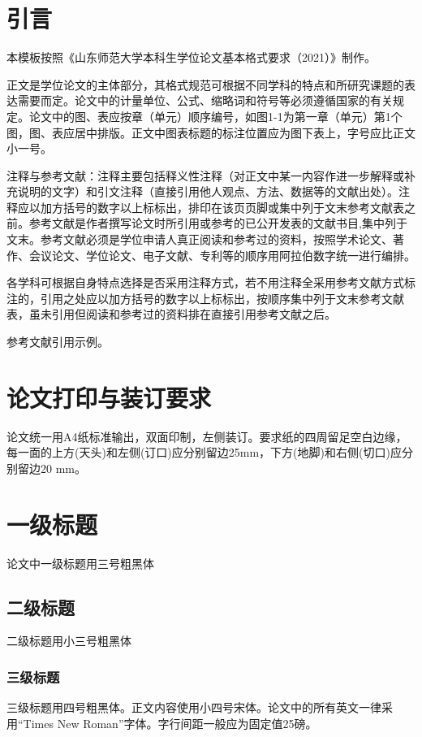 \section{引言}
	本模板按照《山东师范大学本科生学位论文基本格式要求（2021）》制作。
	
	正文是学位论文的主体部分，其格式规范可根据不同学科的特点和所研究课题的表达需要而定。论文中的计量单位、公式、缩略词和符号等必须遵循国家的有关规定。论文中的图、表应按章（单元）顺序编号，如图1-1为第一章（单元）第1个图，图、表应居中排版。正文中图表标题的标注位置应为图下表上，字号应比正文小一号。
	
	注释与参考文献：注释主要包括释义性注释（对正文中某一内容作进一步解释或补充说明的文字）和引文注释（直接引用他人观点、方法、数据等的文献出处）。注释应以加方括号的数字以上标标出，排印在该页页脚或集中列于文末参考文献表之前。参考文献是作者撰写论文时所引用或参考的已公开发表的文献书目,集中列于文末。参考文献必须是学位申请人真正阅读和参考过的资料，按照学术论文、著作、会议论文、学位论文、电子文献、专利等的顺序用阿拉伯数字统一进行编排。
	
	各学科可根据自身特点选择是否采用注释方式，若不用注释全采用参考文献方式标注的，引用之处应以加方括号的数字以上标标出，按顺序集中列于文末参考文献表，虽未引用但阅读和参考过的资料排在直接引用参考文献之后。
	
	参考文献引用示例。
	
\section{论文打印与装订要求}

	论文统一用A4纸标准输出，双面印制，左侧装订。要求纸的四周留足空白边缘，每一面的上方(天头)和左侧(订口)应分别留边25mm，下方(地脚)和右侧(切口)应分别留边20 mm。

\section{一级标题}
	论文中一级标题用三号粗黑体
\subsection{二级标题}
	二级标题用小三号粗黑体
\subsubsection{三级标题}
	三级标题用四号粗黑体。正文内容使用小四号宋体。论文中的所有英文一律采用“Times New Roman”字体。字行间距一般应为固定值25磅。

